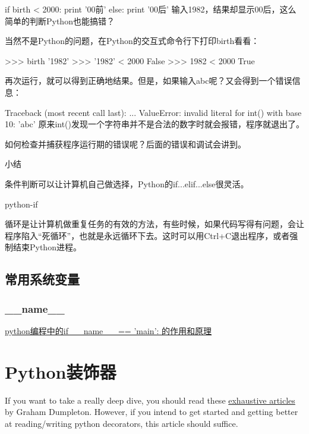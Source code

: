 

if birth < 2000:
    print '00前'
else:
    print '00后'
输入1982，结果却显示00后，这么简单的判断Python也能搞错？

当然不是Python的问题，在Python的交互式命令行下打印birth看看：

>>> birth
'1982'
>>> '1982' < 2000
False
>>> 1982 < 2000
True

再次运行，就可以得到正确地结果。但是，如果输入abc呢？又会得到一个错误信息：

Traceback (most recent call last):
  ...
ValueError: invalid literal for int() with base 10: 'abc'
原来int()发现一个字符串并不是合法的数字时就会报错，程序就退出了。

如何检查并捕获程序运行期的错误呢？后面的错误和调试会讲到。

小结

条件判断可以让计算机自己做选择，Python的if...elif...else很灵活。

python-if

循环是让计算机做重复任务的有效的方法，有些时候，如果代码写得有问题，会让程序陷入“死循环”，也就是永远循环下去。这时可以用Ctrl+C退出程序，或者强制结束Python进程。

\subsection{常用系统变量}

\subsubsection{\_\_name\_\_}
\href{http://www.dengfeilong.com/post/60.html}{python编程中的if \_\_name\_\_ == 'main': 的作用和原理}

\section{Python装饰器}
If you want to take a really deep dive, you should read these \href{https://github.com/GrahamDumpleton/wrapt/tree/develop/blog}{exhaustive articles} by Graham Dumpleton. However, if you intend to get started and getting better at reading/writing python decorators, this article should suffice.

